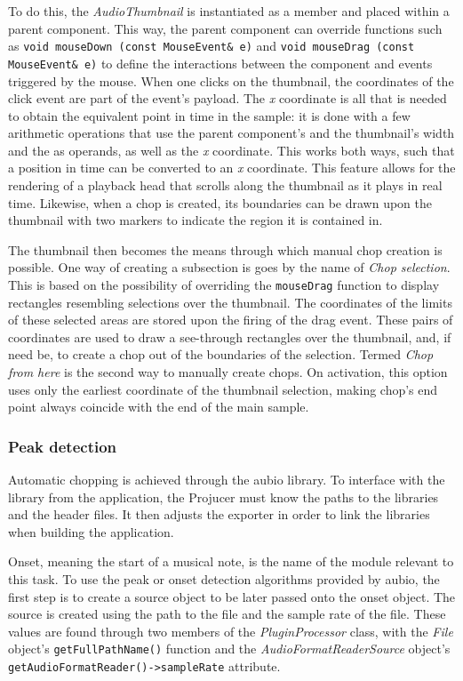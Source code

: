 \documentclass[12pt, a4paper, hidelinks]{article}
\begin{document}
	To do this, the \textit{AudioThumbnail} is instantiated as a member and placed within a parent component. This way, the parent component can override functions such as \texttt{void mouseDown (const MouseEvent\& e)} and \texttt{void mouseDrag (const MouseEvent\& e)} to define the interactions between the component and events triggered by the mouse. When one clicks on the thumbnail, the coordinates of the click event are part of the event's payload. The \textit{x} coordinate is all that is needed to obtain the equivalent point in time in the sample: it is done with a few arithmetic operations that use the parent component's and the thumbnail's width and the as operands, as well as the \textit{x} coordinate. This works both ways, such that a position in time can be converted to an \textit{x} coordinate. This feature allows for the rendering of a playback head that scrolls along the thumbnail as it plays in real time. Likewise, when a chop is created, its boundaries can be drawn upon the thumbnail with two markers to indicate the region it is contained in.\par
	
	The thumbnail then becomes the means through which manual chop creation is possible. One way of creating a subsection is goes by the name of \textit{Chop selection}. This is based on the possibility of overriding the \texttt{mouseDrag} function to display rectangles resembling selections over the thumbnail. The coordinates of the limits of these selected areas are stored upon the firing of the drag event. These pairs of coordinates are used to draw a see-through rectangles over the thumbnail, and, if need be, to create a chop out of the boundaries of the selection. Termed \textit{Chop from here} is the second way to manually create chops. On activation, this option uses only the earliest coordinate of the thumbnail selection, making chop's end point always coincide with the end of the main sample. \par

	\subsubsection{Peak detection}
	Automatic chopping is achieved through the aubio library. To interface with the library from the application, the Projucer must know the paths to the libraries and the header files. It then adjusts the exporter in order to link the libraries when building the application.\par	
	Onset, meaning the start of a musical note, is the name of the module relevant to this task. To use the peak or onset detection algorithms provided by aubio, the first step is to create a source object to be later passed onto the onset object. The source is created using the path to the file and the sample rate of the file. These values are found through two members of the \textit{PluginProcessor} class, with the \textit{File} object's  \texttt{getFullPathName()} function and the \textit{AudioFormatReaderSource} object's \texttt{getAudioFormatReader()->sampleRate} attribute. \par
	
\end{document}
